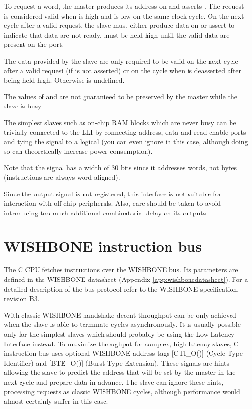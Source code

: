 \documentclass[a4paper,12pt,twoside,extrafontsizes]{memoir}
\begin{document}
To request a word, the master produces its address on  and asserts . The request is considered valid when  is high and  is low on the same clock cycle. On the next cycle after a valid request, the slave must either produce data on  or assert  to indicate that data are not ready.  must be held high until the valid data are present on the  port.

The data provided by the slave are only required to be valid on the next cycle after a valid request (if  is not asserted) or on the cycle when  is deasserted after being held high. Otherwise  is undefined.

The values of  and  are not guaranteed to be preserved by the master while the slave is busy.

The simplest slaves such as on-chip RAM blocks which are never busy can be trivially connected to the LLI by connecting address, data and read enable ports and tying the  signal to a logical  (you can even ignore  in this case, although doing so can theoretically increase power consumption).

Note that the  signal has a width of 30 bits since it addresses words, not bytes (instructions are always word-aligned).

Since the  output signal is not registered, this interface is not suitable for interaction with off-chip peripherals. Also, care should be taken to avoid introducing too much additional combinatorial delay on its outputs.

\section{WISHBONE instruction bus}

The \lxp{}C CPU fetches instructions over the WISHBONE bus. Its parameters are defined in the WISHBONE datasheet (Appendix \ref{app:wishbonedatasheet}). For a detailed description of the bus protocol refer to the WISHBONE specification, revision B3.

With classic WISHBONE handshake decent throughput can be only achieved when the slave is able to terminate cycles asynchronously. It is usually possible only for the simplest slaves which should probably be using the Low Latency Interface instead. To maximize throughput for complex, high latency slaves, \lxp{}C instruction bus uses optional WISHBONE address tags [CTI\_O()] (Cycle Type Identifier) and [BTE\_O()] (Burst Type Extension). These signals are hints allowing the slave to predict the address that will be set by the master in the next cycle and prepare data in advance. The slave can ignore these hints, processing requests as classic WISHBONE cycles, although performance would almost certainly suffer in this case.
\end{document}

